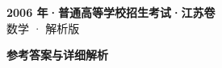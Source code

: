 \documentclass[zihao=-4, a4paper]{ctexart}
\begin{document}
\begin{center}
  {\Large\bfseries 2006 年·普通高等学校招生考试·江苏卷}\\[4pt]
  {\large 数学 · 解析版}
\end{center}
\medskip
{}

\clearpage
{}
\begin{center}{\Large\bfseries 参考答案与详细解析}\end{center}
\medskip

\end{document}
